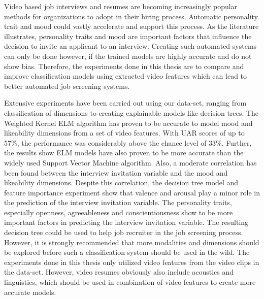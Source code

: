 Video based job interviews and resumes are becoming increasingly popular methods for organizations to adopt in their hiring process. Automatic personality trait and mood could vastly accelerate and support this process. As the literature illustrates, personality traits and mood are important factors that influence the decision to invite an applicant to an interview. Creating such automated systems can only be done however, if the trained models are highly accurate and do not show bias. Therefore, the experiments done in this thesis are to compare and improve classification models using extracted video features which can lead to better automated job screening systems.

Extensive experiments have been carried out using our data-set, ranging from classification of dimensions to creating explainable models like decision trees. The Weighted Kernel ELM algorithm has proven to be accurate to model mood and likeability dimensions from a set of video features. With UAR scores of up to 57\%, the performance was considerably above the chance level of 33\%. Further, the results show ELM models have also proven to be more accurate than the widely used Support Vector Machine algorithm. Also, a moderate correlation has been found between the interview invitation variable and the mood and likeability dimensions. Despite this correlation, the decision tree model and feature importance experiment show that valence and arousal play a minor role in the prediction of the interview invitation variable. The personality traits, especially openness, agreeableness and conscientiousness show to be more important factors in predicting the interview invitation variable. The resulting decision tree could be used to help job recruiter in the job screening process. However, it is strongly recommended that more modalities and dimensions should be explored before such a classification system should be used in the wild. The experiments done in this thesis only utilized video features from the video clips in the data-set. However, video resumes obviously also include acoustics and linguistics, which should be used in combination of video features to create more accurate models. 

